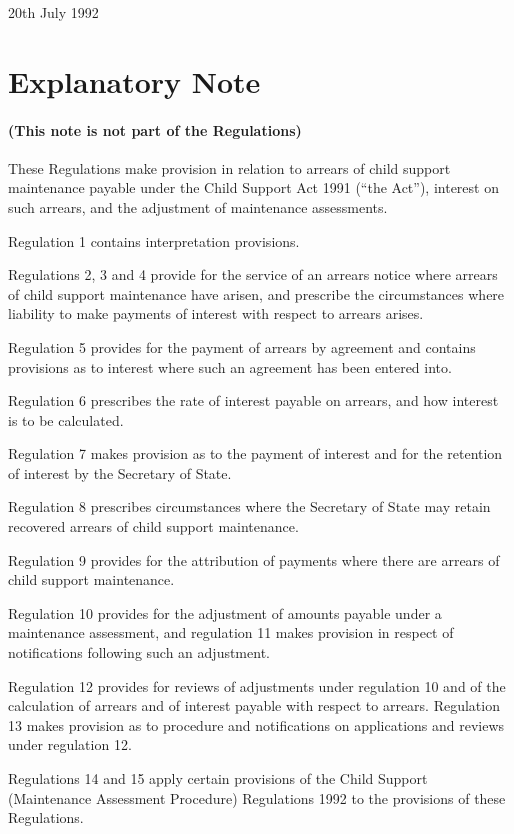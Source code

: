 \documentclass[12pt,a4paper]{article}
\begin{document}
20th July 1992

\part{Explanatory Note}

\renewcommand\parthead{--- Explanatory Note}

\subsection*{(This note is not part of the Regulations)}

 These Regulations make provision in relation to arrears of child support maintenance payable under the Child Support Act 1991 (“the Act”), interest on such arrears, and the adjustment of maintenance assessments.

  Regulation 1 contains interpretation provisions.

  Regulations 2, 3 and 4 provide for the service of an arrears notice where arrears of child support maintenance have arisen, and prescribe the circumstances where liability to make payments of interest with respect to arrears arises.

  Regulation 5 provides for the payment of arrears by agreement and contains provisions as to interest where such an agreement has been entered into.

  Regulation 6 prescribes the rate of interest payable on arrears, and how interest is to be calculated.

  Regulation 7 makes provision as to the payment of interest and for the retention of interest by the Secretary of State.

  Regulation 8 prescribes circumstances where the Secretary of State may retain recovered arrears of child support maintenance.

  Regulation 9 provides for the attribution of payments where there are arrears of child support maintenance.

  Regulation 10 provides for the adjustment of amounts payable under a maintenance assessment, and regulation 11 makes provision in respect of notifications following such an adjustment.

  Regulation 12 provides for reviews of adjustments under regulation 10 and of the calculation of arrears and of interest payable with respect to arrears. Regulation 13 makes provision as to procedure and notifications on applications and reviews under regulation 12.

  Regulations 14 and 15 apply certain provisions of the Child Support (Maintenance Assessment Procedure) Regulations 1992 to the provisions of these Regulations.
\end{document}

